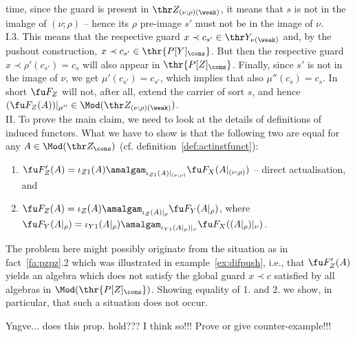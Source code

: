 \begin{PROOF}
time, since the guard is present in $\thr Z_{(\nu;\rho)(\weak)}$, it means
that $s$ is not in the imahge of $(\nu;\rho)$ -- hence its $\rho$ pre-image $s'$ must not be in the
image of $\nu$. 
\\[1ex]
I.3. This means that the respective guard $x\prec c_{s'}\in \thr
Y_{\nu(\weak)}$ and, by the pushout construction, 
$x\prec c_{s'}\in \thr{P[Y]_\cons}$. But then the respective guard $x\prec
\rho'(c_{s'})=c_s$ will also appear in $\thr{P[Z]_\cons}$. Finally, since $s'$ is
not in the image of $\nu$, we get $\mu'(c_{s'})=c_{s'}$, which implies that
also $\mu''(c_{s})=c_{s}$. In short $\fu F_Z$ will not, after all, extend
the carrier of sort $s$, and hence $(\fu F_Z(A))|_{\mu''} \in \Mod(\thr
Z_{(\nu;\rho)(\weak)})$. 
\\[1ex]
II. To prove the main claim, we need to look at the details of definitions of
induced functors. What we have to show is that the following two are equal
for any $A\in\Mod(\thr Z_\cons)$ (cf. definition~\ref{def:actinstfunct}):
\begin{enumerate}\MyLPar
\item $\fu F'_Z(A) = \iota_{Z1}(A) \amalgam_{\iota_{Z1}(A)|_{(\nu;\rho)}} \fu
F_X(A|_{(\nu;\rho)})$ -- direct actualisation, and
\item $\fu F_Z(A) = \iota_{Z}(A) \amalgam_{\iota_{Z}(A)|_{\rho}} \fu
F_Y(A|_{\rho})$, where 
$\fu F_Y(A|_\rho) = \iota_{Y1}(A|_\rho) \amalgam_{\iota_{Y1}(A|_\rho)|_{\nu}} \fu F_X((A|_{\rho})|_\nu)$.
\end{enumerate}
The problem here might possibly originate from the situation as in
fact~\ref{fa:pzpz}.2 which was illustrated in example~\ref{ex:difpush}, i.e.,
that $\fu F'_Z(A)$ yields an algebra which does not satisfy the global guard
$x\prec c$ satisfied by all algebras in $\Mod(\thr{P[Z]_\cons})$. Showing
equality of 1. and 2. we show, in particular, that such a situation does not occur.

{\Large{ Yngve... does this prop. hold??? I think so!!! Prove or give counter-example!!!}}
\end{PROOF}


